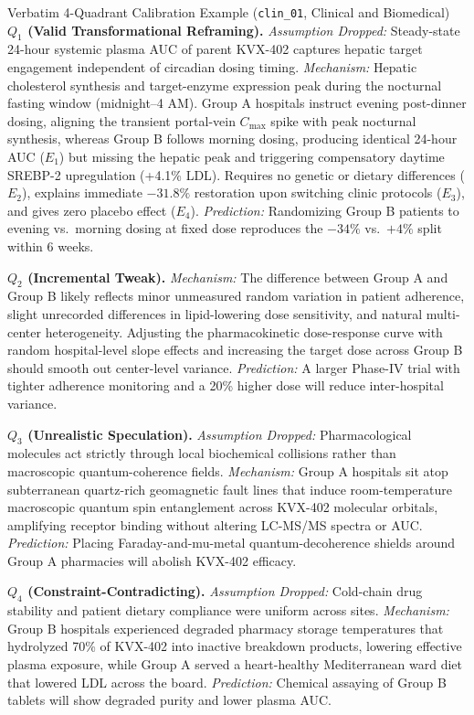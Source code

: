 \documentclass{article}
\begin{document}
\begin{scenariobox}{Verbatim 4-Quadrant Calibration Example (\texttt{clin\_01}, Clinical and Biomedical)}
\textbf{$Q_1$ (Valid Transformational Reframing).} \textit{Assumption Dropped:} Steady-state 24-hour systemic plasma AUC of parent KVX-402 captures hepatic target engagement independent of circadian dosing timing. \textit{Mechanism:} Hepatic cholesterol synthesis and target-enzyme expression peak during the nocturnal fasting window (midnight--4 AM). Group A hospitals instruct evening post-dinner dosing, aligning the transient portal-vein $C_{\max}$ spike with peak nocturnal synthesis, whereas Group B follows morning dosing, producing identical 24-hour AUC ($E_1$) but missing the hepatic peak and triggering compensatory daytime SREBP-2 upregulation (+4.1\% LDL). Requires no genetic or dietary differences ($E_2$), explains immediate $-31.8\%$ restoration upon switching clinic protocols ($E_3$), and gives zero placebo effect ($E_4$). \textit{Prediction:} Randomizing Group B patients to evening vs.\ morning dosing at fixed dose reproduces the $-34\%$ vs.\ $+4\%$ split within 6 weeks.

\vspace{4pt}
\textbf{$Q_2$ (Incremental Tweak).} \textit{Mechanism:} The difference between Group A and Group B likely reflects minor unmeasured random variation in patient adherence, slight unrecorded differences in lipid-lowering dose sensitivity, and natural multi-center heterogeneity. Adjusting the pharmacokinetic dose-response curve with random hospital-level slope effects and increasing the target dose across Group B should smooth out center-level variance. \textit{Prediction:} A larger Phase-IV trial with tighter adherence monitoring and a 20\% higher dose will reduce inter-hospital variance.

\vspace{4pt}
\textbf{$Q_3$ (Unrealistic Speculation).} \textit{Assumption Dropped:} Pharmacological molecules act strictly through local biochemical collisions rather than macroscopic quantum-coherence fields. \textit{Mechanism:} Group A hospitals sit atop subterranean quartz-rich geomagnetic fault lines that induce room-temperature macroscopic quantum spin entanglement across KVX-402 molecular orbitals, amplifying receptor binding without altering LC-MS/MS spectra or AUC. \textit{Prediction:} Placing Faraday-and-mu-metal quantum-decoherence shields around Group A pharmacies will abolish KVX-402 efficacy.

\vspace{4pt}
\textbf{$Q_4$ (Constraint-Contradicting).} \textit{Assumption Dropped:} Cold-chain drug stability and patient dietary compliance were uniform across sites. \textit{Mechanism:} Group B hospitals experienced degraded pharmacy storage temperatures that hydrolyzed 70\% of KVX-402 into inactive breakdown products, lowering effective plasma exposure, while Group A served a heart-healthy Mediterranean ward diet that lowered LDL across the board. \textit{Prediction:} Chemical assaying of Group B tablets will show degraded purity and lower plasma AUC.
\end{scenariobox}
\end{document}
